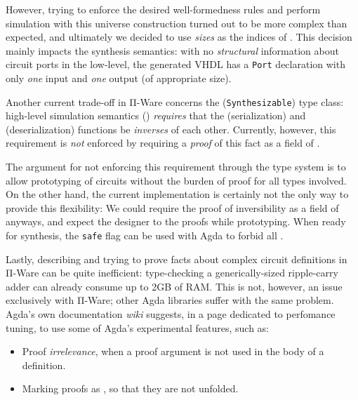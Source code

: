             However, trying to enforce the desired well-formedness rules and perform simulation
            with this universe construction turned out to be more complex than expected,
            and ultimately we decided to use \emph{sizes} as the indices of .
            This decision mainly impacts the synthesis semantics:
            with no \emph{structural} information about circuit ports in the low-level,
            the generated \ac{VHDL} has a \texttt{Port} declaration with only
            \emph{one} input and \emph{one} output (of appropriate size).

            Another current trade-off in Π-Ware concerns the  (\texttt{Synthesizable})
            type class: high-level simulation semantics () \emph{requires} that the
             (serialization) and  (deserialization) functions be \emph{inverses} of each other.
            Currently, however, this requirement is \emph{not} enforced by requiring a \emph{proof} of
            this fact as a field of .

            The argument for not enforcing this requirement through the type system is to allow
            prototyping of circuits without the burden of proof for all types involved.
            On the other hand, the current implementation is certainly not the only way to provide this flexibility:
            We could require the proof of inversibility as a field of  anyways,
            and expect the designer to  the proofs while prototyping.
            When ready for synthesis, the \texttt{safe} flag can be used with Agda to forbid all .

            Lastly, describing and trying to prove facts about complex circuit definitions in Π-Ware
            can be quite inefficient: type-checking a generically-sized ripple-carry adder can already
            consume up to 2GB of RAM.
            This is not, however, an issue exclusively with Π-Ware; other Agda libraries suffer with the same problem.
            Agda's own documentation \emph{wiki} suggests, in a page dedicated to perfomance tuning,
            to use some of Agda's experimental features, such as:

            \begin{itemize}
                \item Proof \emph{irrelevance}, when a proof argument is not used in the body of a definition.
                \item Marking proofs as , so that they are not unfolded.
            \end{itemize}

